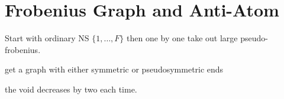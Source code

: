 \section{Frobenius Graph and Anti-Atom}

Start with ordinary NS \(\{1, \dots, F\}\) then one by one take out large pseudo-frobenius.

get a graph with either symmetric or pseudosymmetric ends

the void decreases by two each time. 